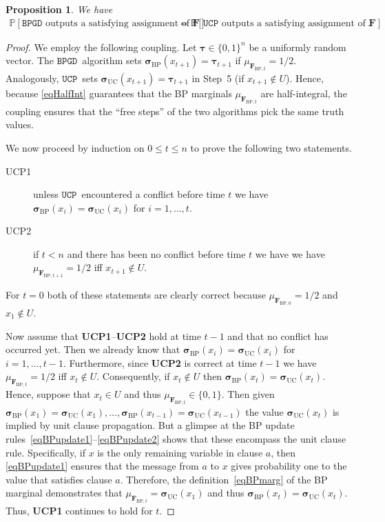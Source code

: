 \documentclass[10pt,reqno]{amsart}
\numberwithin{equation}{section}
\renewcommand{\vec}[1]{\boldsymbol{#1}}
\newcommand{\FBP}[1]{\PHI_{\mathrm{BP},{#1}}}
\newcommand{\BPGD}{\ensuremath{\mathtt{BPGD}}}
\newcommand{\UCP}{\ensuremath{\mathtt{UCP}}}
\newcommand\PHI{\vec F}
\newcommand\SIGBP{\vec\sigma_{\mathrm{BP}}}
\newcommand\SIGUC{\vec\sigma_{\mathrm{UC}}}
\newcommand\TAU{\vec\tau}
\newcommand\brk[1]{\left\lbrack{#1}\right\rbrack}
\newcommand\pr{\mathbb{P}}
\newtheorem{proposition}[definition]{Proposition}
\def\pr{{\mathbb P}}
\begin{document}
\begin{proposition}\label{prop_UCP}
	We have
	\begin{align*}
		\pr\brk{\BPGD\mbox{ outputs a satisfying assignment of }\PHI}&=\pr\brk{\UCP\mbox{ outputs a satisfying assignment of }\PHI}.
	\end{align*}
\end{proposition}
\begin{proof}
	We  employ the following coupling.
	Let $\TAU\in\{0,1\}^n$ be a uniformly random vector.
	The \BPGD\ algorithm sets $\SIGBP(x_{t+1})=\TAU_{t+1}$ if $\mu_{\FBP{t}}=1/2$.
	Analogously, \UCP\ sets $\SIGUC(x_{t+1})=\TAU_{t+1}$ in Step~5 (if $x_{t+1}\not\in U$).
	Hence, because \eqref{eqHalfInt} guarantees that the BP marginals $\mu_{\FBP{t}}$ are half-integral, the coupling ensures that the ``free steps'' of the two algorithms pick the same truth values.

	We now proceed by induction on $0\leq t\leq n$ to prove the following two statements.
	\begin{description}
		\item[UCP1] unless \UCP\ encountered a conflict before time $t$ we have $\SIGBP(x_i)=\SIGUC(x_i)$ for $i=1,\ldots,t$.
		\item[UCP2] if $t<n$ and there has been no conflict before time $t$ we have we have $\mu_{\FBP{t+1}}=1/2$ iff $x_{t+1}\not\in U$.
	\end{description}

	For $t=0$ both of these statements are clearly correct because $\mu_{\FBP{0}}=1/2$ and $x_{1}\not\in U$.

	Now assume that {\bf UCP1}--{\bf UCP2} hold at time $t-1$ and that no conflict has occurred yet.
	Then we already know that $\SIGBP(x_i)=\SIGUC(x_i)$ for $i=1,\ldots,t-1$.
	Furthermore, since {\bf UCP2} is correct at time $t-1$ we have $\mu_{\FBP{t}}=1/2$ iff $x_{t}\not\in U$.
	Consequently, if $x_t\not\in U$ then $\SIGBP(x_t)=\SIGUC(x_t)$.
	Hence, suppose that $x_t\in U$ and thus $\mu_{\FBP{t}}\in\{0,1\}$.
	Then given $\SIGBP(x_1)=\SIGUC(x_1),\ldots,\SIGBP(x_{t-1})=\SIGUC(x_{t-1})$ the value $\SIGUC(x_t)$ is implied by unit clause propagation.
	But a glimpse at the BP update rules~\eqref{eqBPupdate1}--\eqref{eqBPupdate2} shows that these encompass the unit clause rule.
	Specifically, if $x$ is the only remaining variable in clause $a$, then \eqref{eqBPupdate1} ensures that the message from $a$ to $x$ gives probability one to the value that satisfies clause $a$.
	Therefore, the definition~\eqref{eqBPmarg} of the BP marginal demonstrates that $\mu_{\FBP{t}}=\SIGUC(x_1)$ and thus $\SIGBP(x_t)=\SIGUC(x_t)$.
	Thus, {\bf UCP1} continues to hold for $t$.


\end{proof}
\end{document}
